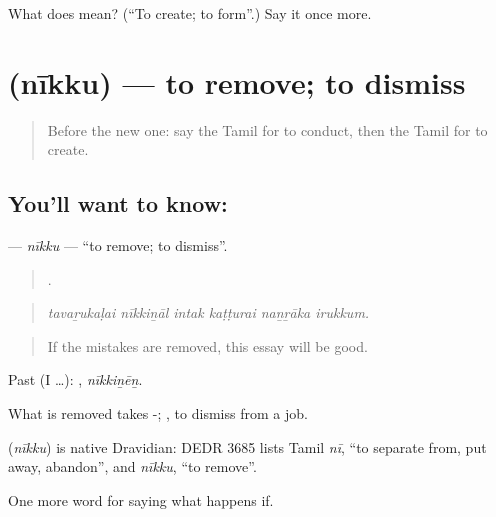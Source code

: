 \begin{tcolorbox}[breakable,colback=teal!4,colframe=teal!35!black,title={Before you move on}]
What does  mean? (\textquotedblleft{}To create; to form\textquotedblright{}.) Say it once more.
\end{tcolorbox}
\section[\texorpdfstring{\ta{நீக்கு} (nīkku)}{நீக்கு (nīkku)}]{ (nīkku) — to remove; to dismiss}

\label{lesson:TA-C395-nikku}



\begin{quote}
Before the new one: say the Tamil for to conduct, then the Tamil for to create.
\end{quote}

\subsection*{You'll want to know: }
\textbf{} — \emph{nīkku} — \textquotedblleft{}to remove; to dismiss\textquotedblright{}.

\begin{quote}
     .
\end{quote}

\begin{quote}
\emph{tavaṟukaḷai nīkkiṉāl intak kaṭṭurai naṉṟāka irukkum.}
\end{quote}

\begin{quote}
If the mistakes are removed, this essay will be good.
\end{quote}

Past (I …): , \emph{nīkkiṉēṉ}.

What is removed takes -;  , to dismiss from a job.

\begin{cousinweb}
\textbf{} (\emph{nīkku}) is native Dravidian: DEDR 3685 lists Tamil \emph{nī}, \textquotedblleft{}to separate from, put away, abandon\textquotedblright{}, and \emph{nīkku}, \textquotedblleft{}to remove\textquotedblright{}.
\end{cousinweb}

\begin{grammarlens}[title={What you've built}]
One more word for saying what happens if.
\end{grammarlens}

